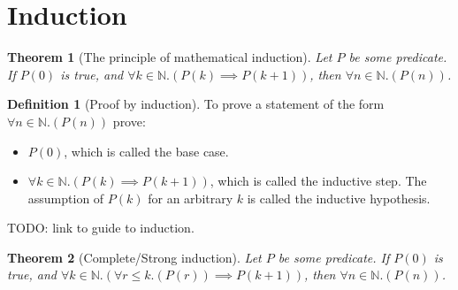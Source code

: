 \documentclass[12pt]{article}
\newtheorem{theorem}{Theorem}[section]
\theoremstyle{definition}
\newtheorem{definition}{Definition}[section]
\begin{document}
\section{Induction}
\begin{theorem}[The principle of mathematical induction]
    Let $P$ be some predicate. If $P(0)$ is true, and $\forall k \in \mathbb{N}.(P(k) \implies P(k+1))$, then $\forall n \in \mathbb{N}. ( P(n))$.
\end{theorem}
\begin{definition}[Proof by induction]
    To prove a statement of the form $\forall n \in \mathbb{N}.(P(n))$ prove:
    \begin{itemize}
        \item $P(0)$, which is called the base case.
        \item $\forall k \in \mathbb{N}.(P(k) \implies P(k+1))$, which is called the inductive step. The assumption of $P(k)$ for an arbitrary $k$ is called the inductive hypothesis.
    \end{itemize}
    TODO: link to guide to induction.
\end{definition}
\begin{theorem}[Complete/Strong induction]
    Let $P$ be some predicate. If $P(0)$ is true, and $\forall k\in \mathbb{N}.(\forall r \leq k. (P(r)) \implies P(k+1))$, then $\forall n \in \mathbb{N}. ( P(n))$.
\end{theorem}
\end{document}
